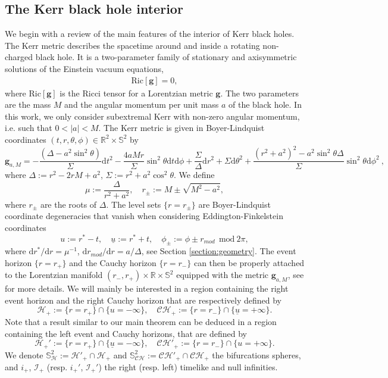\documentclass[reqno]{amsart}
\numberwithin{equation}{section}
\newcommand{\mch}{\mathcal{H}}
\newcommand{\ubar}{{\underline{u}}}
\newcommand{\R}{\mathbb R}
\newcommand{\dee}{\mathrm{d}}
\newcommand{\ch}{\mathcal{CH_+}}
\newcommand{\sph}{\mathbb S}
\theoremstyle{plain}
\theoremstyle{definition}
\theoremstyle{remark}
\numberwithin{equation}{section}
\begin{document}
\subsection{The Kerr black hole interior}
We begin with a review of the main features of the interior of Kerr black holes. The Kerr metric describes the spacetime around and inside a rotating non-charged black hole. It is a two-parameter family of stationary and axisymmetric solutions of the Einstein {vacuum equations,
\begin{align}\label{eqn:eve}
    \mathrm{Ric}[\mathbf{g}]=0,
\end{align}
where $\mathrm{Ric}[\mathbf{g}]$ is the Ricci tensor for a Lorentzian metric $\mathbf{g}$.} The two parameters are the mass $M$ and the angular momentum per unit mass $a$ of the black hole. In this work, we only consider subextremal Kerr with non-zero angular momentum, i.e. such that $0<|a|<M$. The Kerr metric is given in Boyer-Lindquist coordinates $(t,r,\theta,\phi)\in\mathbb{R}^2\times\mathbb{S}^2$ by 
$$\mathbf{g}_{a,M}=-\frac{(\Delta-a^2\sin^2\theta)}{\Sigma}\dee t^2-\frac{4aMr}{\Sigma}\sin^2\theta \dee t \dee \phi+\frac{\Sigma}{\Delta}\dee r^2+\Sigma\dee \theta^2+\frac{{(r^2+a^2)^2-a^2\sin^2\theta\Delta}}{\Sigma}\sin^2\theta \dee \phi^2\:,$$
where $\Delta:=r^2-2rM+a^2$, $\Sigma:=r^2+a^2\cos^2\theta$. We define
$$\mu:=\frac{\Delta}{r^2+a^2},\quad r_{\pm}:=M\pm\sqrt{M^2-a^2},$$
where $r_{\pm}$ are the roots of $\Delta$. {The level sets $\{r=r_\pm\}$ are Boyer-Lindquist coordinate degeneracies that vanish} when considering Eddington-Finkelstein coordinates
$$u:=r^*-t,\quad\ubar:=r^*+t,\quad\phi_{\pm}:=\phi\pm r_{mod}\:\:\text{mod}\:2\pi,$$
where $\dee r^*/\dee r=\mu^{-1}$, $\dee r_{mod}/\dee r=a/\Delta$, see Section \ref{section:geometry}. The event horizon $\{r=r_+\}$ and the Cauchy horizon $\{r=r_-\}$ can then be properly attached to the Lorentzian manifold $(r_-,r_+)\times\R\times \mathbb{S}^2$ equipped with the metric $\mathbf{g}_{a,M}$, see \cite[Chapter 2]{oneill} for more details. We will mainly be interested in a region containing the right event horizon and the right Cauchy horizon that are respectively defined by
$$\mch_+:=\{r=r_+\}\cap\{u=-\infty\},\quad\ch:=\{r=r_-\}\cap\{\ubar=+\infty\}.$$
Note that a result similar to our main theorem can be deduced in a region containing the left event and Cauchy horizons, that are defined by
$$\mch_+':=\{r=r_+\}\cap\{\ubar=-\infty\},\quad\mathcal{CH}'_+:=\{r=r_-\}\cap\{u=+\infty\}.$$
We denote $\sph^2_{\mch}:=\mch'_+\cap\mch_+$ and $\sph^2_{\mathcal{CH}}:=\mathcal{CH}'_+\cap\ch$ the bifurcations spheres, and $i_+$, $\mathcal{I}_+$ (resp. $i_+'$, $\mathcal{I}_+'$) the right (resp. left) timelike and null infinities.
\end{document}
